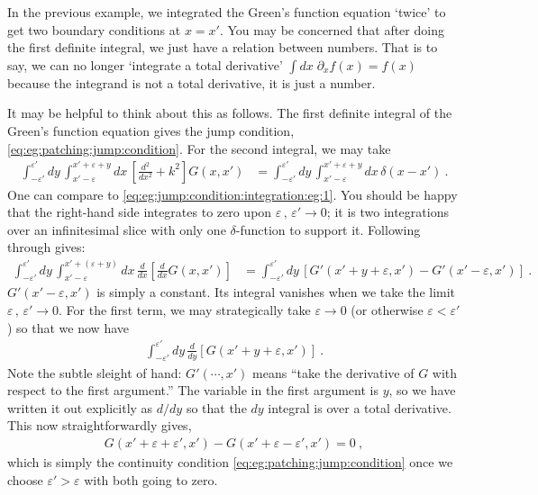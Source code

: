 \begin{example}%
In the previous example, we integrated the Green's function equation `twice' to get two boundary conditions at $x=x'$. You may be concerned that after doing the first definite integral, we just have a relation between numbers. That is to say, we can no longer `integrate a total derivative' $\int dx\; \partial_x f(x) = f(x)$ because the integrand is not a total derivative, it is just a number. 

It may be helpful to think about this as follows. The first definite integral of the Green's function equation gives the jump condition, \eqref{eq:eg:patching:jump:condition}. For the second integral, we may take
\begin{align}
	\int_{-\varepsilon'}^{\varepsilon'}
	dy \,
	\int_{x'-\varepsilon}^{x'+\varepsilon+y}
	dx \, 
	\left[
	 \frac{d^2}{dx^2} + k^2
	\right]
	G(x,x')
	&=
	\int_{-\varepsilon'}^{\varepsilon'}
	dy \,
	\int_{x'-\varepsilon}^{x'+\varepsilon+y}
	dx \, 
	\delta (x-x') 
	\ .
\end{align}
One can compare to \eqref{eq:eg:jump:condition:integration:eg:1}. You should be happy that the right-hand side integrates to zero upon $\varepsilon\, , \, \varepsilon' \to 0$; it is two integrations over an infinitesimal slice with only one $\delta$-function to support it. Following through gives:
\begin{align}
	\int_{-\varepsilon'}^{\varepsilon'}
	dy \,
	\int_{x'-\varepsilon}^{x'+(\varepsilon+y)}
	dx \, 
	\frac{d}{dx}
	\left[
	 \frac{d}{dx}
	 G(x,x')
	\right]
	&=
	\int_{-\varepsilon'}^{\varepsilon'}
	dy \,
	\left[
	 G'(x'+y+\varepsilon,x')
	 -
	 G'(x'-\varepsilon, x')
	\right] \ .
\end{align}
$G'(x'-\varepsilon, x')$ is simply a constant. Its integral vanishes when we take the limit $\varepsilon\, ,\, \varepsilon'\to 0$. For the first term, we may strategically take $\varepsilon\to 0$  (or otherwise $\varepsilon < \varepsilon'$) so that we now have
\begin{align}
	\int_{-\varepsilon'}^{\varepsilon'}
	dy \,
	\frac{d}{dy}
	\left[
	 G(x'+y+\varepsilon,x')
	 \right] \ .
\end{align}
Note the subtle sleight of hand: $G'(\cdots, x')$ means ``take the derivative of $G$ with respect to the first argument.'' The variable in the first argument is $y$, so we have written it out explicitly as $d/dy$ so that the $dy$ integral is over a total derivative. This now straightforwardly gives, 
\begin{align}
	G(x'+\varepsilon+\varepsilon', x') 
	-
	G(x'+\varepsilon-\varepsilon', x') 
	= 0 \ ,
\end{align}
which is simply the continuity condition \eqref{eq:eg:patching:jump:condition} once we choose $\varepsilon' > \varepsilon$ with both going to zero.
\end{example}

